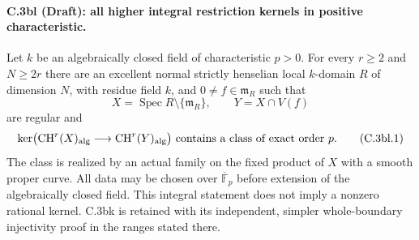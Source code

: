 

\paragraph{C.3bl (Draft): all higher integral restriction kernels in positive characteristic.}
Let $k$ be an algebraically closed field of characteristic $p>0$.
For every $r\ge2$ and $N\ge2r$ there are an excellent normal
strictly henselian local $k$-domain $R$ of dimension $N$, with residue
field $k$, and $0\ne f\in\mathfrak m_R$ such that
\[
 X=\operatorname{Spec}R\setminus\{\mathfrak m_R\},\qquad
 Y=X\cap V(f)
\]
are regular and
\[
 \ker\bigl(\mathrm{CH}^r(X)_{\rm alg}
             \longrightarrow\mathrm{CH}^r(Y)_{\rm alg}\bigr)
 \text{ contains a class of exact order }p.
 \tag{C.3bl.1}
\]
The class is realized by an actual family on the fixed product of
$X$ with a smooth proper curve. All data may be chosen over
$\overline{\mathbb F}_p$ before extension of the algebraically
closed field. This integral statement does not imply a nonzero
rational kernel. C.3bk is retained with its independent, simpler
whole-boundary injectivity proof in the ranges stated there.

